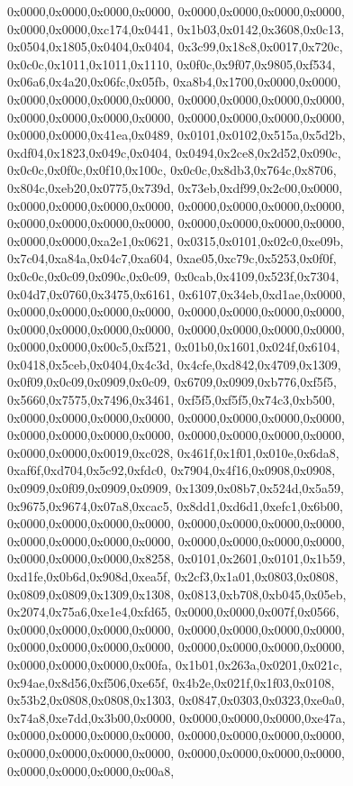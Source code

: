 {	0x0000,0x0000,0x0000,0x0000,
	0x0000,0x0000,0x0000,0x0000,
	0x0000,0x0000,0xc174,0x0441,
	0x1b03,0x0142,0x3608,0x0c13,
	0x0504,0x1805,0x0404,0x0404,
	0x3c99,0x18c8,0x0017,0x720c,
	0x0c0c,0x1011,0x1011,0x1110,
	0x0f0c,0x9f07,0x9805,0xf534,
	0x06a6,0x4a20,0x06fc,0x05fb,
	0xa8b4,0x1700,0x0000,0x0000,
	0x0000,0x0000,0x0000,0x0000,
	0x0000,0x0000,0x0000,0x0000,
	0x0000,0x0000,0x0000,0x0000,
	0x0000,0x0000,0x0000,0x0000,
	0x0000,0x0000,0x41ea,0x0489,
	0x0101,0x0102,0x515a,0x5d2b,
	0xdf04,0x1823,0x049c,0x0404,
	0x0494,0x2ce8,0x2d52,0x090c,
	0x0c0c,0x0f0c,0x0f10,0x100c,
	0x0c0c,0x8db3,0x764c,0x8706,
	0x804c,0xeb20,0x0775,0x739d,
	0x73eb,0xdf99,0x2c00,0x0000,
	0x0000,0x0000,0x0000,0x0000,
	0x0000,0x0000,0x0000,0x0000,
	0x0000,0x0000,0x0000,0x0000,
	0x0000,0x0000,0x0000,0x0000,
	0x0000,0x0000,0xa2e1,0x0621,
	0x0315,0x0101,0x02c0,0xe09b,
	0x7c04,0xa84a,0x04c7,0xa604,
	0xae05,0xc79c,0x5253,0x0f0f,
	0x0c0c,0x0c09,0x090c,0x0c09,
	0x0cab,0x4109,0x523f,0x7304,
	0x04d7,0x0760,0x3475,0x6161,
	0x6107,0x34eb,0xd1ae,0x0000,
	0x0000,0x0000,0x0000,0x0000,
	0x0000,0x0000,0x0000,0x0000,
	0x0000,0x0000,0x0000,0x0000,
	0x0000,0x0000,0x0000,0x0000,
	0x0000,0x0000,0x00c5,0xf521,
	0x01b0,0x1601,0x024f,0x6104,
	0x0418,0x5ceb,0x0404,0x4c3d,
	0x4cfe,0xd842,0x4709,0x1309,
	0x0f09,0x0c09,0x0909,0x0c09,
	0x6709,0x0909,0xb776,0xf5f5,
	0x5660,0x7575,0x7496,0x3461,
	0xf5f5,0xf5f5,0x74c3,0xb500,
	0x0000,0x0000,0x0000,0x0000,
	0x0000,0x0000,0x0000,0x0000,
	0x0000,0x0000,0x0000,0x0000,
	0x0000,0x0000,0x0000,0x0000,
	0x0000,0x0000,0x0019,0xc028,
	0x461f,0x1f01,0x010e,0x6da8,
	0xaf6f,0xd704,0x5c92,0xfdc0,
	0x7904,0x4f16,0x0908,0x0908,
	0x0909,0x0f09,0x0909,0x0909,
	0x1309,0x08b7,0x524d,0x5a59,
	0x9675,0x9674,0x07a8,0xcac5,
	0x8dd1,0xd6d1,0xefc1,0x6b00,
	0x0000,0x0000,0x0000,0x0000,
	0x0000,0x0000,0x0000,0x0000,
	0x0000,0x0000,0x0000,0x0000,
	0x0000,0x0000,0x0000,0x0000,
	0x0000,0x0000,0x0000,0x8258,
	0x0101,0x2601,0x0101,0x1b59,
	0xd1fe,0x0b6d,0x908d,0xea5f,
	0x2cf3,0x1a01,0x0803,0x0808,
	0x0809,0x0809,0x1309,0x1308,
	0x0813,0xb708,0xb045,0x05eb,
	0x2074,0x75a6,0xe1e4,0xfd65,
	0x0000,0x0000,0x007f,0x0566,
	0x0000,0x0000,0x0000,0x0000,
	0x0000,0x0000,0x0000,0x0000,
	0x0000,0x0000,0x0000,0x0000,
	0x0000,0x0000,0x0000,0x0000,
	0x0000,0x0000,0x0000,0x00fa,
	0x1b01,0x263a,0x0201,0x021c,
	0x94ae,0x8d56,0xf506,0xe65f,
	0x4b2e,0x021f,0x1f03,0x0108,
	0x53b2,0x0808,0x0808,0x1303,
	0x0847,0x0303,0x0323,0xe0a0,
	0x74a8,0xe7dd,0x3b00,0x0000,
	0x0000,0x0000,0x0000,0xe47a,
	0x0000,0x0000,0x0000,0x0000,
	0x0000,0x0000,0x0000,0x0000,
	0x0000,0x0000,0x0000,0x0000,
	0x0000,0x0000,0x0000,0x0000,
	0x0000,0x0000,0x0000,0x00a8,
}

